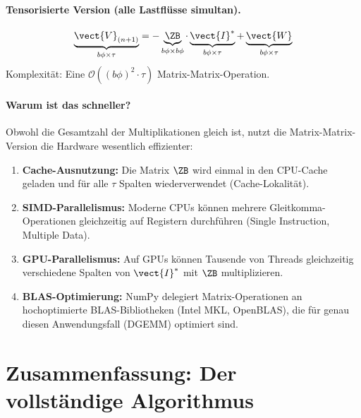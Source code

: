 \paragraph{Tensorisierte Version (alle Lastflüsse simultan).}
\begin{equation}
	\underbrace{\vect{V}_{(n+1)}}_{b\phi \times \tau} = -\underbrace{\ZB}_{b\phi \times b\phi} \cdot \underbrace{\vect{I}^*}_{b\phi \times \tau} + \underbrace{\vect{W}}_{b\phi \times \tau}
	\label{eq:tensorisiert}
\end{equation}
Komplexität: Eine $\mathcal{O}((b\phi)^2 \cdot \tau)$ Matrix-Matrix-Operation.

\paragraph{Warum ist das schneller?} Obwohl die Gesamtzahl der Multiplikationen gleich ist, nutzt die Matrix-Matrix-Version die Hardware wesentlich effizienter:
\begin{enumerate}
	\item \textbf{Cache-Ausnutzung:} Die Matrix $\ZB$ wird einmal in den CPU-Cache geladen und für alle $\tau$ Spalten wiederverwendet (Cache-Lokalität).
	\item \textbf{SIMD-Parallelismus:} Moderne CPUs können mehrere Gleitkomma-Operationen gleichzeitig auf Registern durchführen (Single Instruction, Multiple Data).
	\item \textbf{GPU-Parallelismus:} Auf GPUs können Tausende von Threads gleichzeitig verschiedene Spalten von $\vect{I}^*$ mit $\ZB$ multiplizieren.
	\item \textbf{BLAS-Optimierung:} NumPy delegiert Matrix-Operationen an hochoptimierte BLAS-Bibliotheken (Intel MKL, OpenBLAS), die für genau diesen Anwendungsfall (DGEMM) optimiert sind.
\end{enumerate}

\section{Zusammenfassung: Der vollständige Algorithmus}
\label{sec:algorithmus_zusammenfassung}

